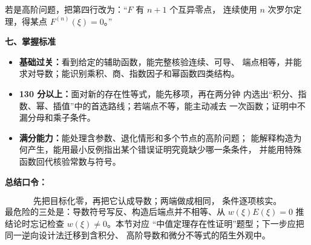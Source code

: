 \begin{knowledgeBox}
若是高阶问题，把第四行改为：“\(F\) 有 \(n+1\) 个互异零点，
连续使用 \(n\) 次罗尔定理，得某点 \(F^{(n)}(\xi)=0\)。”

\textbf{七、掌握标准}

\begin{itemize}
  \item \textbf{基础过关：}看到给定的辅助函数，能完整核验连续、可导、
  端点相等，并能求对导数；能识别乘积、商、指数因子和幂函数四类结构。
  \item \textbf{130 分以上：}面对新的存在性等式，能先移项，再在两分钟
  内选出“积分、指数、幂、插值”中的首选路线；若端点不等，能主动减去
  一次函数；证明中不漏分母和乘子条件。
  \item \textbf{满分能力：}能处理含参数、退化情形和多个节点的高阶问题；
  能解释构造为何产生，能用最小反例指出某个错误证明究竟缺少哪一条条件，
  并能用特殊函数回代核验常数与符号。
\end{itemize}

\textbf{总结口令：}

\[
\boxed{\text{先把目标化零，再把它认成导数；两端做成相同，
条件逐项核实。}}
\]
最危险的三处是：导数符号写反、构造后端点并不相等、从
\(w(\xi)E(\xi)=0\) 推结论时忘记检查 \(w(\xi)\ne0\)。本节对应
“中值定理存在性证明”题型；下一步应把同一逆向设计法迁移到含积分、
高阶导数和微分不等式的陌生外观中。
\end{knowledgeBox}


\par

